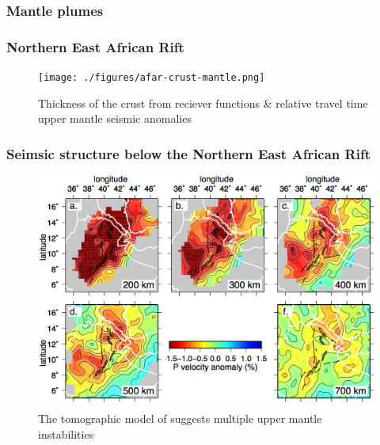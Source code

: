 \documentclass[aspectratio=169]{beamer}
\begin{document}
\begin{frame}
    \frametitle{Mantle plumes}

\end{frame}

\begin{frame}
    \frametitle{Northern East African Rift}
    \begin{figure}
        \texttt{[image: ./figures/afar-crust-mantle.png]}
        \caption{Thickness of the crust from reciever functions \& relative travel time upper mantle seismic anomalies}
    \end{figure}
\end{frame}

\begin{frame}
    \frametitle{Seimsic structure below the Northern East African Rift}
    \begin{figure}
        \vspace{-0.3cm}
        \includegraphics[height=0.7\paperheight]{./figures/civiero-2016.png}
        \caption{The tomographic model of \cite{civiero-etal-2016} suggests multiple upper mantle instabilities}
    \end{figure}
\end{frame}
\end{document}
